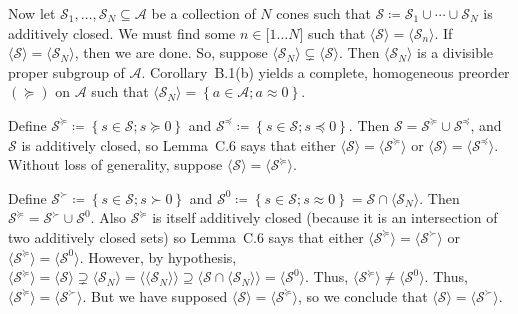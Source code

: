 \documentclass[
]{article}
\begin{document}
Now let \(\mathcal{S}_{1},\ldots,\mathcal{S}_{N} \subseteq \mathcal{A}\)
be a collection of \(N\) cones such that
\(\mathcal{S} ≔ \mathcal{S}_{1} \cup \cdots \cup \mathcal{S}_{N}\) is
additively closed. We must find some \(n \in \lbrack 1\ldots N\rbrack\)
such that
\({\langle\mathcal{S}\rangle} = {\langle\mathcal{S}_{n}\rangle}\). If
\({\langle\mathcal{S}\rangle} = {\langle\mathcal{S}_{N}\rangle}\), then
we are done. So, suppose
\({\langle\mathcal{S}_{N}\rangle} \subsetneq {\langle\mathcal{S}\rangle}\).
Then \(\langle\mathcal{S}_{N}\rangle\) is a divisible proper subgroup of
\(\mathcal{A}\). Corollary~B.1(b) yields a complete, homogeneous
preorder \(( \succeq )\) on \(\mathcal{A}\) such that
\({\langle\mathcal{S}_{N}\rangle} = \left\{ a \in \mathcal{A};a \approx 0 \right\}\).

Define
\(\mathcal{S}^{\succeq} ≔ \left\{ s \in \mathcal{S};s \succeq 0 \right\}\)
and
\(\mathcal{S}^{\preceq} ≔ \left\{ s \in \mathcal{S};s \preceq 0 \right\}\).
Then \(\mathcal{S} = \mathcal{S}^{\succeq} \cup \mathcal{S}^{\preceq}\),
and \(\mathcal{S}\) is additively closed, so Lemma~C.6 says that either
\({\langle\mathcal{S}\rangle} = {\langle\mathcal{S}^{\succeq}\rangle}\)
or
\({\langle\mathcal{S}\rangle} = {\langle\mathcal{S}^{\preceq}\rangle}\).
Without loss of generality, suppose
\({\langle\mathcal{S}\rangle} = {\langle\mathcal{S}^{\succeq}\rangle}\).

Define
\(\mathcal{S}^{\succ} ≔ \left\{ s \in \mathcal{S};s \succ 0 \right\}\)
and
\(\mathcal{S}^{0} ≔ \left\{ s \in \mathcal{S};s \approx 0 \right\} = \mathcal{S} \cap {\langle\mathcal{S}_{N}\rangle}\).
Then
\(\mathcal{S}^{\succeq} = \mathcal{S}^{\succ} \cup \mathcal{S}^{0}\).
Also \(\mathcal{S}^{\succeq}\) is itself additively closed (because it
is an intersection of two additively closed sets) so Lemma~C.6 says that
either
\({\langle\mathcal{S}^{\succeq}\rangle} = {\langle\mathcal{S}^{\succ}\rangle}\)
or
\({\langle\mathcal{S}^{\succeq}\rangle} = {\langle\mathcal{S}^{0}\rangle}\).
However, by hypothesis,
\({\langle\mathcal{S}^{\succeq}\rangle} = {\langle\mathcal{S}\rangle} \supsetneq {\langle\mathcal{S}_{N}\rangle} = {\langle{\langle\mathcal{S}_{N}\rangle}\rangle} \supseteq {\langle\mathcal{S} \cap {\langle\mathcal{S}_{N}\rangle}\rangle} = {\langle\mathcal{S}^{0}\rangle}\).
Thus,
\({\langle\mathcal{S}^{\succeq}\rangle} \neq {\langle\mathcal{S}^{0}\rangle}\).
Thus,
\({\langle\mathcal{S}^{\succeq}\rangle} = {\langle\mathcal{S}^{\succ}\rangle}\).
But we have supposed
\({\langle\mathcal{S}\rangle} = {\langle\mathcal{S}^{\succeq}\rangle}\),
so we conclude that
\({\langle\mathcal{S}\rangle} = {\langle\mathcal{S}^{\succ}\rangle}\).
\end{document}
